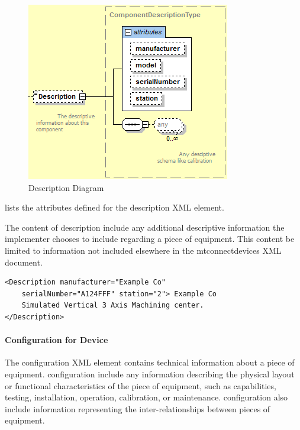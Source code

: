 \begin{figure}[ht]
  \centering
  \includegraphics[width=.75\textwidth]{figures/description-schema-diagram.png}
  \caption{Description Diagram}
  \label{fig:description-schema-diagram}
\end{figure}

\FloatBarrier

 lists the attributes defined for the \gls{description} XML element.



The content of \gls{description} \may include any additional descriptive information the implementer chooses to include regarding a piece of equipment.  This content \should be limited to information not included elsewhere in the \gls{mtconnectdevices} XML document.

\begin{lstlisting}[firstnumber=1,escapechar=|,%
    caption={Example of  Description},label={lst:example-of-description}]
<Description manufacturer="Example Co" 
    serialNumber="A124FFF" station="2"> Example Co 
    Simulated Vertical 3 Axis Machining center.
</Description>
\end{lstlisting}

\paragraph{Configuration for Device}\mbox{}
\label{sec:Configuration for Device}

The \gls{configuration} XML element contains technical information about a piece of equipment.  \gls{configuration} \MAY include any information describing the physical layout or functional characteristics of the piece of equipment, such as capabilities, testing, installation, operation, calibration, or maintenance. \gls{configuration} \MAY also include information representing the inter-relationships between pieces of equipment.

